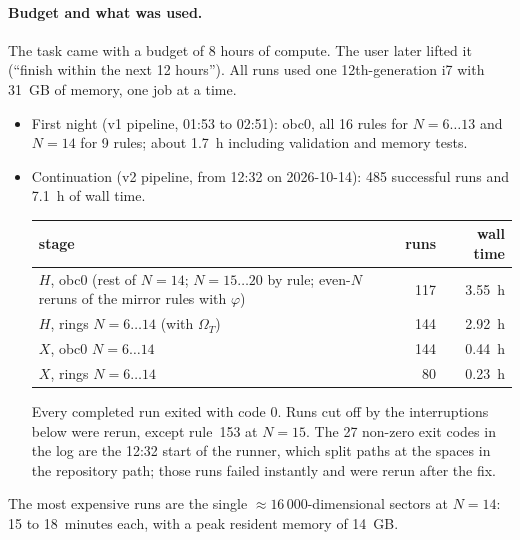 \paragraph{Budget and what was used.} The task came with a budget of 8 hours of compute. The user later lifted it
(``finish within the next 12 hours''). All runs used one 12th-generation i7 with 31~GB of memory, one job at a time.
\begin{itemize}
\item First night (v1 pipeline, 01:53 to 02:51): obc0, all 16 rules for $N=6\ldots13$ and $N=14$ for 9 rules; about
  1.7~h including validation and memory tests.
\item Continuation (v2 pipeline, from 12:32 on 2026-10-14): 485 successful runs and 7.1~h of wall time.
  \begin{center}\small
  \begin{tabular}{p{}rr}
  \toprule
  stage & runs & wall time \\
  \midrule
  $H$, obc0 (rest of $N=14$; $N=15\ldots20$ by rule; even-$N$ reruns of the mirror rules with $\varphi$) & 117 & 3.55~h \\
  $H$, rings $N=6\ldots14$ (with $\Omega_T$) & 144 & 2.92~h \\
  $X$, obc0 $N=6\ldots14$ & 144 & 0.44~h \\
  $X$, rings $N=6\ldots14$ & 80 & 0.23~h \\
  \bottomrule
  \end{tabular}
  \end{center}
  Every completed run exited with code 0. Runs cut off by the interruptions below were rerun, except rule~153 at
  $N=15$. The 27 non-zero exit codes in the log are the 12:32 start of the runner, which split paths at the spaces in the repository path; those runs
  failed instantly and were rerun after the fix.
\end{itemize}
The most expensive runs are the single $\approx16\,000$-dimensional sectors at $N=14$: 15 to 18~minutes each, with a peak
resident memory of 14~GB.

